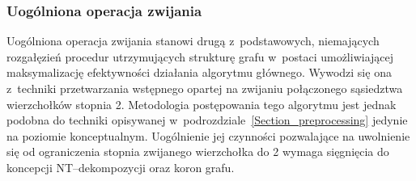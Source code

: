 \subsubsection{\textbf{Uogólniona operacja zwijania}}\label{sss_ckx_general_fold}
\par{
  Uogólniona operacja zwijania stanowi drugą z~podstawowych, niemających rozgałęzień procedur utrzymujących strukturę grafu w~postaci umożliwiającej maksymalizację efektywności działania algorytmu głównego.
  Wywodzi się ona z~techniki przetwarzania wstępnego opartej na zwijaniu połączonego sąsiedztwa wierzchołków stopnia 2.
  Metodologia postępowania tego algorytmu jest jednak podobna do techniki opisywanej w~podrozdziale~\ref{Section_preprocessing} jedynie na poziomie konceptualnym.
  Uogólnienie jej czynności pozwalające na uwolnienie się od ograniczenia stopnia zwijanego wierzchołka do 2 wymaga sięgnięcia do koncepcji NT--dekompozycji oraz koron grafu.
}
